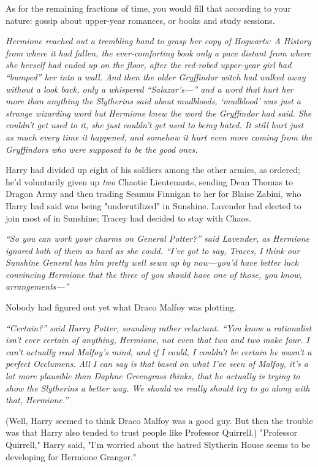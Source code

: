 As for the remaining fractions of time, you would fill that according to your
nature: gossip about upper-year romances, or books and study sessions.

\emph{Hermione reached out a trembling hand to grasp her copy of \emph{Hogwarts: A
History} from where it had fallen, the ever-comforting book only a pace
distant from where she herself had ended up on the floor, after the red-robed
upper-year girl had ``bumped'' her into a wall. And then the older Gryffindor
witch had walked away without a look back, only a whispered \mbox{``Salazar's—''} and
a word that hurt her more than anything the Slytherins said about mudbloods,
`mudblood' was just a strange wizarding word but Hermione knew the word the
Gryffindor had said. She couldn't get used to it, she just couldn't get used to
being hated. It still hurt just as much every time it happened, and somehow it
hurt even more coming from the Gryffindors who were \emph{supposed} to be the
good ones.}

Harry had divided up eight of his soldiers among the other armies, as ordered;
he'd voluntarily given up \emph{two} Chaotic Lieutenants, sending Dean Thomas
to Dragon Army and then trading Seamus Finnigan to her for Blaise Zabini, who
Harry had said was being "underutilized" in Sunshine. Lavender had elected to
join most of \SPHEW in Sunshine; Tracey had decided to stay with Chaos.

\emph{``So you can work your charms on General Potter?'' said Lavender, as
Hermione ignored both of them as hard as she could. ``I've got to say, Traces, I
think our Sunshine General has him pretty well sewn up by now—you'd have
better luck convincing Hermione that the three of you should have one of those,
you know, arrangements—''}

Nobody had figured out yet what Draco Malfoy was plotting.

\emph{``Certain?'' said Harry Potter, sounding rather reluctant. ``You know a
rationalist isn't ever certain of anything, Hermione, not even that two and two
make four. I can't actually read Malfoy's mind, and if I could, I couldn't be
certain he wasn't a perfect Occlumens. All I can say is that based on what I've
seen of Malfoy, it's a lot more plausible than Daphne Greengrass thinks, that
he actually is trying to show the Slytherins a better way. We should{\el} we
really should try to go along with that, Hermione.''}

(Well, Harry seemed to think Draco Malfoy was a good guy. But then the trouble
was that Harry also tended to trust people like Professor Quirrell.)
\sbreak
"Professor Quirrell," Harry said, "I'm worried about the hatred Slytherin House
seems to be developing for Hermione Granger."

